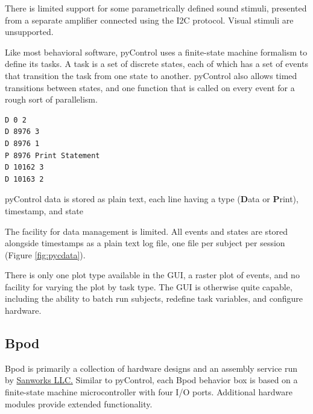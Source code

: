 There is limited support for some parametrically defined sound stimuli, presented from a separate amplifier connected using the I2C protocol. Visual stimuli are unsupported.

Like most behavioral software, pyControl uses a finite-state machine formalism to define its tasks. A task is a set of discrete states, each of which has a set of events that transition the task from one state to another. pyControl also allows timed transitions between states, and one function that is called on every event for a rough sort of parallelism.

\begin{marginfigure}[-0.4cm]
\begin{verbatim}
D 0 2
D 8976 3
D 8976 1
P 8976 Print Statement
D 10162 3
D 10163 2
\end{verbatim}
\caption{pyControl data is stored as plain text, each line having a type (\textbf{D}ata or \textbf{P}rint), timestamp, and state}
\label{fig:pycdata}
\end{marginfigure}

The facility for data management is limited. All events and states are stored alongside timestamps as a plain text log file, one file per subject per session (Figure \ref{fig:pycdata}).

There is only one plot type available in the GUI, a raster plot of events, and no facility for varying the plot by task type. The GUI is otherwise quite capable, including the ability to batch run subjects, redefine task variables, and configure hardware.\\

\subsection{Bpod}

Bpod is primarily a collection of hardware designs and an assembly service run by \href{https://www.sanworks.io/about/about.php}{Sanworks LLC.} Similar to pyControl, each Bpod behavior box is based on a finite-state machine microcontroller with four I/O ports. Additional hardware modules provide extended functionality.


